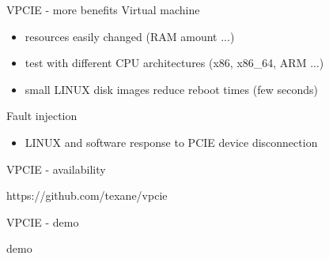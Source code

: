 \documentclass{beamer}
\begin{document}
\begin{frame}{VPCIE - more benefits}
  Virtual machine
  \begin{itemize}
  \item resources easily changed (RAM amount ...)
  \item test with different CPU architectures (x86, x86\_64, ARM ...)
  \item small LINUX disk images reduce reboot times (few seconds)
  \end{itemize}
  Fault injection
  \begin{itemize}
  \item LINUX and software response to PCIE device disconnection
  \end{itemize}
\end{frame}

\begin{frame}{VPCIE - availability}
  \begin{center}https://github.com/texane/vpcie\end{center}
\end{frame}

\begin{frame}{VPCIE - demo}
  \begin{center}demo\end{center}
\end{frame}
\end{document}
